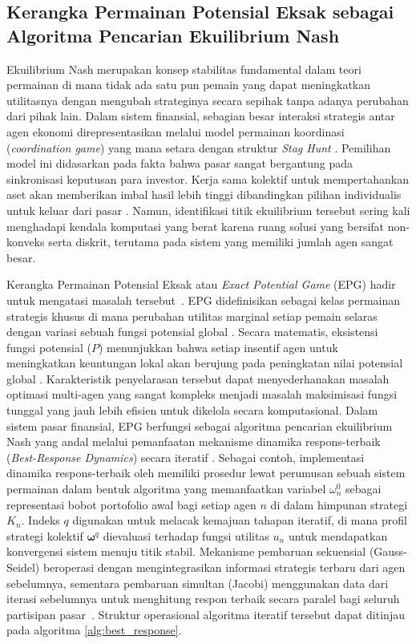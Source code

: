 \subsection{Kerangka Permainan Potensial Eksak sebagai Algoritma Pencarian Ekuilibrium Nash}
Ekuilibrium Nash merupakan konsep stabilitas fundamental dalam teori permainan di mana tidak ada satu pun pemain yang dapat meningkatkan utilitasnya dengan mengubah strateginya secara sepihak tanpa adanya perubahan dari pihak lain. Dalam sistem finansial, sebagian besar interaksi strategis antar agen ekonomi direpresentasikan melalui model permainan koordinasi (\textit{coordination game}) yang mana setara dengan struktur \textit{Stag Hunt} \cite{szabo_evolutionary_2016}. Pemilihan model ini didasarkan pada fakta bahwa pasar sangat bergantung pada sinkronisasi keputusan para investor. Kerja sama kolektif untuk mempertahankan aset akan memberikan imbal hasil lebih tinggi dibandingkan pilihan individualis untuk keluar dari pasar \cite{sarkar_quantum_2018}. Namun, identifikasi titik ekuilibrium tersebut sering kali menghadapi kendala komputasi yang berat karena ruang solusi yang bersifat non-konveks serta diskrit, terutama pada sistem yang memiliki jumlah agen sangat besar.

Kerangka Permainan Potensial Eksak atau \textit{Exact Potential Game} (EPG) hadir untuk mengatasi masalah tersebut~. EPG didefinisikan sebagai kelas permainan strategis khusus di mana perubahan utilitas marginal setiap pemain selaras dengan variasi sebuah fungsi potensial global \cite{monderer_potential_1996}. Secara matematis, eksistensi fungsi potensial ($P$) menunjukkan bahwa setiap insentif agen untuk meningkatkan keuntungan lokal akan berujung pada peningkatan nilai potensial global . Karakteristik penyelarasan tersebut dapat menyederhanakan masalah optimasi multi-agen yang sangat kompleks menjadi masalah maksimisasi fungsi tunggal yang jauh lebih efisien untuk dikelola secara komputasional. Dalam sistem pasar finansial, EPG berfungsi sebagai algoritma pencarian ekuilibrium Nash yang andal melalui pemanfaatan mekanisme dinamika respons-terbaik (\textit{Best-Response Dynamics}) secara iteratif . Sebagai contoh, implementasi dinamika respons-terbaik oleh  memiliki prosedur lewat perumusan sebuah sistem permainan dalam bentuk algoritma yang memanfaatkan variabel $\omega_n^0$ sebagai representasi bobot portofolio awal bagi setiap agen $n$ di dalam himpunan strategi $K_n$. Indeks $q$ digunakan untuk melacak kemajuan tahapan iteratif, di mana profil strategi kolektif $\mathbf{\omega}^q$ dievaluasi terhadap fungsi utilitas $u_n$ untuk mendapatkan konvergensi sistem menuju titik stabil. Mekanisme pembaruan sekuensial (Gauss-Seidel) beroperasi dengan mengintegrasikan informasi strategis terbaru dari agen sebelumnya, sementara pembaruan simultan (Jacobi) menggunakan data dari iterasi sebelumnya untuk menghitung respon terbaik secara paralel bagi seluruh partisipan pasar~. Struktur operasional algoritma iteratif tersebut dapat ditinjau pada algoritma \ref{alg:best_response}.

